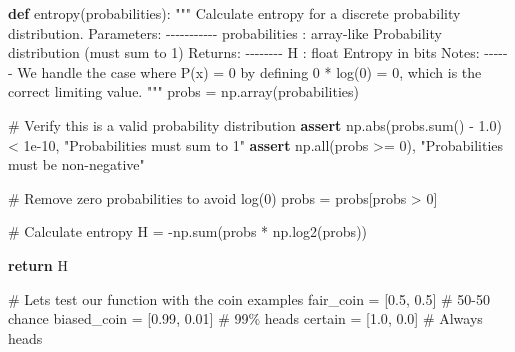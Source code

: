 \documentclass[
  11pt,
  letterpaper,
  oneside,
  openany]{book}
\newenvironment{Shaded}{\begin{snugshade}}{\end{snugshade}}
\newcommand{\BuiltInTok}[1]{\textcolor[rgb]{0.00,0.23,0.31}{#1}}
\newcommand{\CommentTok}[1]{\textcolor[rgb]{0.37,0.37,0.37}{#1}}
\newcommand{\ControlFlowTok}[1]{\textcolor[rgb]{0.00,0.23,0.31}{\textbf{#1}}}
\newcommand{\DecValTok}[1]{\textcolor[rgb]{0.68,0.00,0.00}{#1}}
\newcommand{\FloatTok}[1]{\textcolor[rgb]{0.68,0.00,0.00}{#1}}
\newcommand{\KeywordTok}[1]{\textcolor[rgb]{0.00,0.23,0.31}{\textbf{#1}}}
\newcommand{\NormalTok}[1]{\textcolor[rgb]{0.00,0.23,0.31}{#1}}
\newcommand{\OperatorTok}[1]{\textcolor[rgb]{0.37,0.37,0.37}{#1}}
\newcommand{\StringTok}[1]{\textcolor[rgb]{0.13,0.47,0.30}{#1}}
\begin{document}
\begin{Shaded}
\begin{Highlighting}[]
\KeywordTok{def}\NormalTok{ entropy(probabilities):}
    \CommentTok{"""}
\CommentTok{    Calculate entropy for a discrete probability distribution.}
\CommentTok{    }
\CommentTok{    Parameters:}
\CommentTok{    {-}{-}{-}{-}{-}{-}{-}{-}{-}{-}{-}}
\CommentTok{    probabilities : array{-}like}
\CommentTok{        Probability distribution (must sum to 1)}
\CommentTok{    }
\CommentTok{    Returns:}
\CommentTok{    {-}{-}{-}{-}{-}{-}{-}{-}}
\CommentTok{    H : float}
\CommentTok{        Entropy in bits}
\CommentTok{        }
\CommentTok{    Notes:}
\CommentTok{    {-}{-}{-}{-}{-}{-}}
\CommentTok{    We handle the case where P(x) = 0 by defining 0 * log(0) = 0,}
\CommentTok{    which is the correct limiting value.}
\CommentTok{    """}
\NormalTok{    probs }\OperatorTok{=}\NormalTok{ np.array(probabilities)}
    
    \CommentTok{\# Verify this is a valid probability distribution}
    \ControlFlowTok{assert}\NormalTok{ np.}\BuiltInTok{abs}\NormalTok{(probs.}\BuiltInTok{sum}\NormalTok{() }\OperatorTok{{-}} \FloatTok{1.0}\NormalTok{) }\OperatorTok{\textless{}} \FloatTok{1e{-}10}\NormalTok{, }\StringTok{"Probabilities must sum to 1"}
    \ControlFlowTok{assert}\NormalTok{ np.}\BuiltInTok{all}\NormalTok{(probs }\OperatorTok{\textgreater{}=} \DecValTok{0}\NormalTok{), }\StringTok{"Probabilities must be non{-}negative"}
    
    \CommentTok{\# Remove zero probabilities to avoid log(0)}
\NormalTok{    probs }\OperatorTok{=}\NormalTok{ probs[probs }\OperatorTok{\textgreater{}} \DecValTok{0}\NormalTok{]}
    
    \CommentTok{\# Calculate entropy}
\NormalTok{    H }\OperatorTok{=} \OperatorTok{{-}}\NormalTok{np.}\BuiltInTok{sum}\NormalTok{(probs }\OperatorTok{*}\NormalTok{ np.log2(probs))}
    
    \ControlFlowTok{return}\NormalTok{ H}

\CommentTok{\# Let\textquotesingle{}s test our function with the coin examples}
\NormalTok{fair\_coin }\OperatorTok{=}\NormalTok{ [}\FloatTok{0.5}\NormalTok{, }\FloatTok{0.5}\NormalTok{]  }\CommentTok{\# 50{-}50 chance}
\NormalTok{biased\_coin }\OperatorTok{=}\NormalTok{ [}\FloatTok{0.99}\NormalTok{, }\FloatTok{0.01}\NormalTok{]  }\CommentTok{\# 99\% heads}
\NormalTok{certain }\OperatorTok{=}\NormalTok{ [}\FloatTok{1.0}\NormalTok{, }\FloatTok{0.0}\NormalTok{]  }\CommentTok{\# Always heads}


\end{Highlighting}
\end{Shaded}
\end{document}
